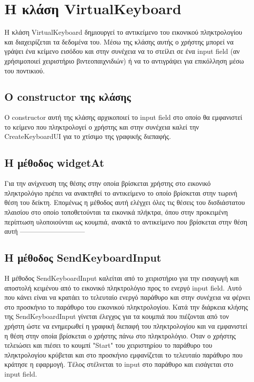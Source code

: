 
\section{Η κλάση VirtualKeyboard}

Η κλάση VirtualKeyboard δημιουργεί το αντικείμενο του εικονικού πληκτρολογίου και διαχειρίζεται
τα δεδομένα του. Μέσω της κλάσης αυτής ο χρήστης μπορεί να γράψει ένα κείμενο εισόδου και στην
συνέχεια να το στείλει σε ένα input field (αν χρήσιμοποιεί χειριστήριο βιντεοπαιχνιδιών) ή να 
το αντιγράψει για επικόλληση μέσω του ποντικιού.  


\subsection{Ο constructor της κλάσης}
Ο constructor αυτή της κλάσης αρχικοποιεί το input field στο οποίο θα εμφανιστεί το κείμενο που
πληκτρολογεί ο χρήστης και στην συνέχεια καλεί την CreateKeyboardUI για το χτίσιμο της γραφικής
διεπαφής.


\subsection{Η μέθοδος widgetAt}
Για την ανίχνευση της θέσης στην οποία βρίσκεται χρήστης στο εικονικό πληκτρολόγιο πρέπει να
ανακτηθεί το αντικείμενο το οποίο βρίσκεται στην τωρινή θέση του δείκτη. Επομένως η μέθοδος
αυτή ελέγχει όλες τις θέσεις του δισδιάστατου πλαισίου στο οποίο τοποθετούνται τα εικονικά
πλήκτρα, όπου στην προκειμένη περίπτωση υλοποιούνται ως κουμπιά, ανακτά το αντικείμενο που
βρίσκεται στην θέση αυτή -----------------------------

\subsection{Η μέθοδος SendKeyboardInput}
Η μέθοδος SendKeyboardInput καλείται από το χειριστήριο για την εισαγωγή και αποστολή κειμένου
από το εικονικό πληκτρολόγιο προς το ενεργό input field. Αυτό που κάνει είναι να κρατάει το
τελευταίο ενεργό παράθυρο και στην συνέχεια να φέρνει στο προσκήνιο το παράθυρο του εικονικού
πληκτρολογίου. Κατά την διάρκεια κλήσης της SendKeyboardInput γίνεται έλεγχος για τα κουμπιά
που πιέζονται από τον χρήστη ώστε να ενημερωθεί η γραφική διεπαφή του πληκτρολογίου και να
εμφανιστεί η θέση στην οποία βρίσκεται ο χρήστης πάνω στο πληκτρολόγιο. Όταν ο χρήστης τελειώσει
και πιέσει το κουμπί "Start" του χειριστηρίου το παράθυρο του πληκτρολογίου κρύβεται και στο
προσκήνιο εμφανίζεται το τελευταίο παράθυρο που κράτησε η εφαρμογή. Τέλος στέλνεται το input
στο παράθυρο και εισάγεται στο input field.



